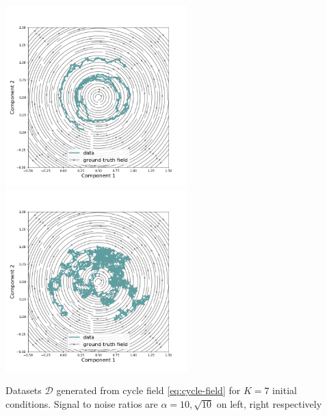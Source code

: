 \begin{Figure}
\includegraphics[width=70mm]{figures/sample-data-2.png}
\includegraphics[width=70mm]{figures/sample-data-3.png}
\caption{\textcolor{Emerald}{Datasets} $\mathcal{D}$ generated from cycle field \eqref{eq:cycle-field}
for $K=7$ initial \\conditions. Signal to noise ratios are $\alpha=10,\sqrt{10}$
on left, right respectively}
\label{fig:sample-data}
\end{Figure}

